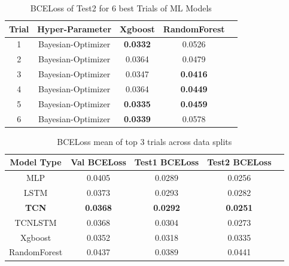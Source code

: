 \begin{table}[t]
\caption{BCELoss of Test2 for 6 best Trials of ML Models}
\vspace{0.1 in}
\centering
\resizebox{3.3in}{!}
{%
\begin{tabular}{|c|c|c|c|c|}
\hline
{\bf Trial} & {\bf Hyper-Parameter} & {\bf Xgboost} & {\bf RandomForest} \\  
\hline\hline
1  		&  Bayesian-Optimizer &  {\bf 0.0332} &  0.0526   \\ 
2	  		&  Bayesian-Optimizer &  0.0364 &  0.0479   \\ 
3  		&  Bayesian-Optimizer &  0.0347 &  {\bf 0.0416}  \\ 
4	  		&  Bayesian-Optimizer &  0.0364 &  {\bf 0.0449}  \\ 
5	  		&  Bayesian-Optimizer &  {\bf 0.0335} &  {\bf 0.0459}  \\ 
6	  		&  Bayesian-Optimizer &  {\bf 0.0339} &  0.0578  \\ 
\hline
\end{tabular}
}
\label{tab:mlmodels}
\end{table}


\begin{table}[t]
\caption{ BCELoss mean of top 3 trials across data splits}
\vspace{0.1 in}
\centering
\resizebox{3.3in}{!}
{%
\begin{tabular}{|c|c|c|c|c|}
\hline
{\bf Model Type} & {\bf Val BCELoss} & {\bf Test1 BCELoss} & {\bf Test2 BCELoss} \\ 
\hline\hline 
MLP	  		&  0.0405 &  0.0289 &  0.0256  \\ \hline
LSTM  		&  0.0373 &  0.0293 &  0.0282 \\ \hline
{\bf TCN}			&  {\bf 0.0368}  &  {\bf 0.0292} &  {\bf 0.0251}  \\ \hline
TCNLSTM 	& 0.0368  & 0.0304	& 0.0273	 \\ \hline
Xgboost 	& 0.0352 & 0.0318	& 0.0335	\\ \hline
RandomForest & 0.0437 & 0.0389	& 0.0441	\\ \hline
\end{tabular}
}
\label{tab:training}
\end{table}


